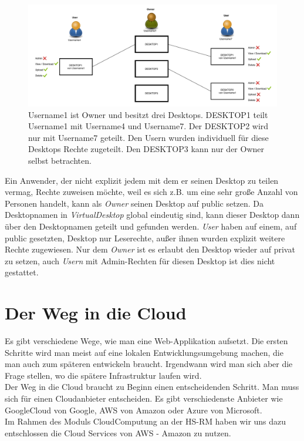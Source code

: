 \documentclass[a4paper, 12pt]{scrreprt}
\renewcommand\_{\textunderscore\allowbreak}
\begin{document}
\begin{figure}[h]
\centering
\includegraphics[scale=0.45]{VD_konzept.pdf}
\caption{Username1 ist Owner und besitzt drei Desktops. DESKTOP1 teilt Username1 mit Username4 und Username7. Der DESKTOP2 wird nur mit Username7 geteilt. Den Usern wurden individuell für diese Desktops Rechte zugeteilt. Den DESKTOP3 kann nur der Owner selbst betrachten.}
\end{figure}

\noindent Ein Anwender, der nicht explizit jedem mit dem er seinen Desktop zu teilen vermag, Rechte zuweisen möchte, weil es sich z.B. um eine sehr große Anzahl von Personen handelt, kann als \textit{Owner} seinen Desktop auf public setzen.
Da Desktopnamen in \textit{VirtualDesktop} global eindeutig sind, kann dieser Desktop dann über den Desktopnamen geteilt und gefunden werden.
\textit{User} haben auf einem, auf public gesetzten, Desktop nur Leserechte, außer ihnen wurden explizit weitere Rechte zugewiesen. 
Nur dem \textit{Owner} ist es erlaubt den Desktop wieder auf privat zu setzen, auch \textit{Usern} mit Admin-Rechten für diesen Desktop ist dies nicht gestattet.
 

\chapter{Der Weg in die Cloud}
Es gibt verschiedene Wege, wie man eine Web-Applikation aufsetzt. Die ersten Schritte wird man meist auf eine lokalen Entwicklungsumgebung machen, die man auch zum späteren entwickeln braucht. Irgendwann wird man sich aber die Frage stellen, wo die spätere Infrastruktur laufen wird. \\
Der Weg in die Cloud braucht zu Beginn einen entscheidenden Schritt. Man muss sich für einen Cloudanbieter entscheiden. Es gibt verschiedenste Anbieter wie GoogleCloud von Google, AWS von Amazon oder Azure von Microsoft. \\
Im Rahmen des Moduls CloudComputung an der HS-RM haben wir uns dazu entschlossen die Cloud Services von AWS - Amazon zu nutzen.
\end{document}
